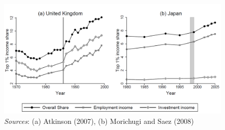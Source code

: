 \documentclass{article}
\begin{document}
\begin{figure}[h!]
  \centering
  
    \includegraphics[width=\linewidth]{Figure1_decomposition.PNG}
  	\caption{\textit{Sources}: (a) Atkinson (2007), (b) Morichugi and Saez (2008)}
\end{figure}
\end{document}
